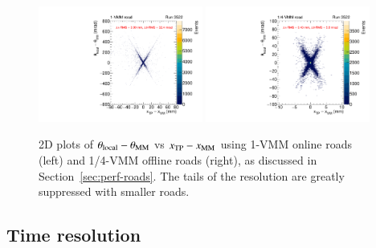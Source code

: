 \begin{figure}[!htpb]
  \begin{center}
    \includegraphics[width=0.48\textwidth]{figures/gbtanalysis3522/TP_xres_angres_full.pdf}
    \includegraphics[width=0.48\textwidth]{figures/gbtanalysis3522/TP_xres_angres.pdf}
  \end{center}
  \vspace{-10pt}
  \caption{2D plots of $\theta_{\rm local}-\theta_{\rm MM} $ vs  $x_{\rm TP}-x_{\rm MM}$
   using 1-VMM online roads (left) and 1/4-VMM offline roads (right), 
as discussed in Section~\ref{sec:perf-roads}. The tails of the resolution are greatly suppressed with smaller roads.}
  \label{fig:xthetares}
\end{figure}
\subsection{Time resolution}

